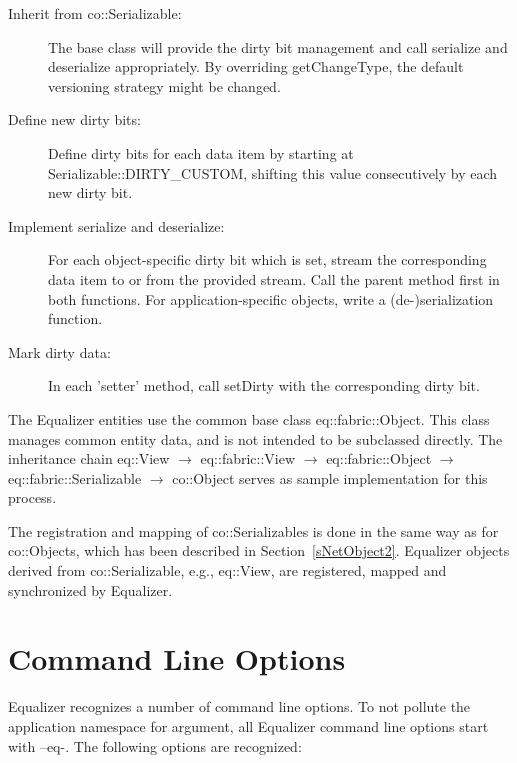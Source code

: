 \documentclass[10pt,a4]{scrartcl}
\newcommand{\sref}[1]{Section~\ref{#1}}
\begin{document}
\begin{description}
\item[Inherit from \textsf{co::Serializable}:] The base class will
  provide the dirty bit management and call serialize and deserialize
  appropriately. By overriding \textsf{get\-Chan\-ge\-Type}, the default
  versioning strategy might be changed.
\item[Define new dirty bits:] Define dirty bits for each data item by
  starting at \textsf{Serializable::DIRTY\_CUSTOM}, shifting this value
  consecutively by each new dirty bit.
\item[Implement serialize and deserialize:] For each object-specific
  dirty bit which is set, stream the corresponding data item to or from
  the provided stream. Call the parent method first in both
  functions. For application-specific objects, write a (de-)serialization
  function.
\item[Mark dirty data:] In each 'setter' method, call \textsf{setDirty}
  with the corresponding dirty bit.
\end{description}

The Equalizer entities use the common base class
\textsf{eq::fabric::Object}. This class manages common entity data, and is not
intended to be subclassed directly.  The inheritance chain \textsf{eq::View}
$\rightarrow$ \textsf{eq::fabric::View} $\rightarrow$
\textsf{eq::fabric::Object} $\rightarrow$ \textsf{eq::fabric::Se\-rial\-izable}
$\rightarrow$ \textsf{co::Object} serves as sample implementation for this
process.

The registration and mapping of \textsf{co::Serializable}s is done in
the same way as for \textsf{co::Object}s, which has been described in
\sref{sNetObject2}. Equalizer objects derived from
\textsf{co::Serializable}, e.g., \textsf{eq::View}, are registered,
mapped and synchronized by Equalizer.


\newpage
\appendix
\section{Command Line Options}

Equalizer recognizes a number of command line options. To not pollute the
application namespace for argument, all Equalizer command line options start
with \textsf{--eq-}. The following options are recognized:
\end{document}
